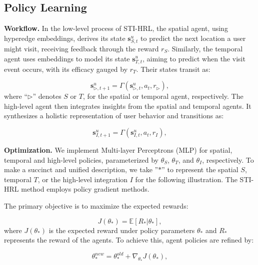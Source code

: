\documentclass[letterpaper]{article} %
\begin{document}
\subsection{Policy Learning}

\noindent \textbf{Workflow. }
In the low-level process of STI-HRL,
the spatial agent, using hyperedge embeddings, derives its state $ \mathbf{s}^{u}_{S,t} $ to predict the next location a user might visit, receiving feedback through the reward $ r_S $.
Similarly, the temporal agent uses embeddings to model its state $ \mathbf{s}^{u}_{T,t} $, aiming to predict when the visit event occurs, with its efficacy gauged by $ r_T $. Their states transit as:

\begin{equation}
\mathbf{s}^{u}_{\triangleright,t+1} = \Gamma(\mathbf{s}^{u}_{\triangleright,t}, a_{t}, r_\triangleright),
\end{equation}
where ``$\triangleright$'' denotes $S$ or $T$, for the spatial or temporal agent, respectively.
The high-level agent then integrates insights from the spatial and temporal agents. It synthesizes a holistic representation of user behavior and transitions as:

\begin{equation}
 \mathbf{s}^{u}_{I,t+1} = \Gamma(\mathbf{s}^{u}_{I,t}, a_{t}, r_{I}),
\end{equation}

\noindent \textbf{Optimization. }
We implement Multi-layer Perceptrons (MLP) for spatial, temporal and high-level policies, parameterized by $\theta_{S}$, $\theta_{T}$, and $\theta_{I}$, respectively.
To make a succinct and unified description, we take ''$*$'' to represent the spatial $S$, temporal $T$, or the high-level integration $I$ for the following illustration.
The STI-HRL method employs policy gradient \cite{agarwal2020optimality} methods.

The primary objective is to maximize the expected rewards:

\begin{equation}
    J(\theta_*) = \mathbb{E}[R_{*} | \theta_{*}],
\end{equation}
where $ J(\theta_*) $ is the expected reward under policy parameters $ \theta_* $ and $ R_* $ represents the reward of the agents. To achieve this, agent policies are refined by:

\begin{equation}
      \theta_{*}^{new} = \theta_{*}^{old} + \nabla_{\theta_{*}} J(\theta_*),
\end{equation}
\end{document}
